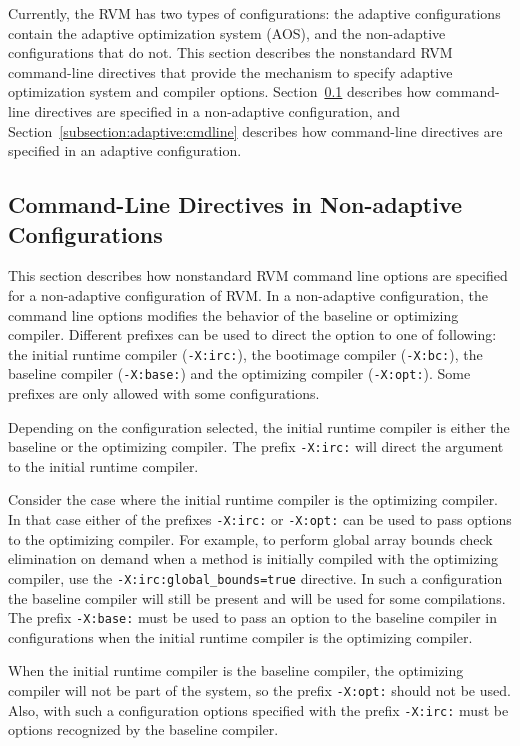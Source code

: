 
Currently, the RVM has two types of configurations:
the adaptive configurations contain the adaptive optimization system (AOS),
and the non-adaptive configurations that do not.  
This section describes the nonstandard RVM command-line directives that 
provide the mechanism to specify adaptive optimization system and
compiler options.
Section~\ref{subsection:nonadaptive:cmdline} describes how command-line 
directives are specified in a non-adaptive configuration, and 
Section~\ref{subsection:adaptive:cmdline} describes how command-line 
directives are specified in an adaptive configuration.

\subsection{Command-Line Directives in Non-adaptive Configurations}
\label{subsection:nonadaptive:cmdline}

This section describes how nonstandard RVM command line options are 
specified for a non-adaptive configuration of RVM.
In a non-adaptive configuration, the command line options modifies
the behavior of the baseline or optimizing compiler. Different prefixes
can be used to direct the option to one of following: the initial runtime 
compiler ({\tt -X:irc:}), the bootimage compiler ({\tt -X:bc:}),
the baseline compiler ({\tt -X:base:}) and the optimizing
compiler ({\tt -X:opt:}). Some prefixes are only allowed with some configurations.

Depending on the configuration selected, the initial runtime compiler is 
either the baseline or the optimizing compiler. The prefix {\tt -X:irc:} will
direct the argument to the initial runtime compiler. 

Consider the case where the initial runtime compiler is the optimizing 
compiler. In that case either of the 
prefixes {\tt -X:irc:} or {\tt -X:opt:} can be used to pass options to
the optimizing compiler. 
For example, to perform global array bounds check elimination on demand
when a method is initially compiled with the optimizing compiler,
use the {\tt -X:irc:global\_bounds=true} directive.
In such a configuration the baseline compiler will
still be present and will be used for some compilations. The prefix {\tt -X:base:}
must be used to pass an option to the baseline compiler in 
configurations when the initial runtime compiler is the optimizing compiler.

When the initial runtime compiler is the baseline compiler, the optimizing
compiler will not be part of the system, so the prefix {\tt -X:opt:} should
not be used. Also, with such a configuration options specified with the prefix
{\tt -X:irc:} must be options recognized by the baseline compiler.

